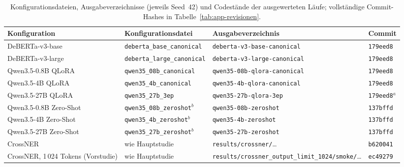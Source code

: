 \begin{table}[ht]
  \centering
  \footnotesize
  \caption[Konfigurationsdateien, Ausgabeverzeichnisse und Codestände der Läufe]{Konfigurationsdateien, Ausgabeverzeichnisse (jeweils Seed~42)
  und Codestände der ausgewerteten Läufe; vollständige Commit-Hashes in
  Tabelle~\ref{tab:app-revisionen}.}
  \label{tab:app-laeufe}
  \setlength{\tabcolsep}{3pt}
  \begin{tabularx}{\linewidth}{@{}>{\raggedright\arraybackslash}p{3.3cm}%
      >{\raggedright\arraybackslash}p{4.35cm}>{\raggedright\arraybackslash}X%
      l@{}}
    \toprule
    \textbf{Konfiguration} & \textbf{Konfigurationsdatei} &
    \textbf{Ausgabeverzeichnis} & \textbf{Commit} \\
    \midrule
    DeBERTa-v3-base       & \texttt{deberta\_base\_canonical}  & \texttt{deberta-v3-base-canonical}  & \texttt{179eed8} \\
    \addlinespace
    DeBERTa-v3-large      & \texttt{deberta\_large\_canonical} & \texttt{deberta-v3-large-canonical} & \texttt{179eed8} \\
    \addlinespace
    Qwen3.5-0.8B QLoRA    & \texttt{qwen35\_08b\_canonical}    & \texttt{qwen35-08b-qlora-canonical} & \texttt{179eed8} \\
    \addlinespace
    Qwen3.5-4B QLoRA      & \texttt{qwen35\_4b\_canonical}     & \texttt{qwen35-4b-qlora-canonical}  & \texttt{179eed8} \\
    \addlinespace
    Qwen3.5-27B QLoRA     & \texttt{qwen35\_27b\_3ep}          & \texttt{qwen35-27b-qlora-3ep}       & \texttt{179eed8}$^{a}$ \\
    \addlinespace
    Qwen3.5-0.8B Zero-Shot & \texttt{qwen35\_08b\_zeroshot}$^{b}$ & \texttt{qwen35-08b-zeroshot}     & \texttt{137bffd} \\
    \addlinespace
    Qwen3.5-4B Zero-Shot  & \texttt{qwen35\_4b\_zeroshot}$^{b}$  & \texttt{qwen35-4b-zeroshot}      & \texttt{137bffd} \\
    \addlinespace
    Qwen3.5-27B Zero-Shot & \texttt{qwen35\_27b\_zeroshot}$^{b}$ & \texttt{qwen35-27b-zeroshot}     & \texttt{137bffd} \\
    \addlinespace
    CrossNER           & wie Hauptstudie                    & \texttt{results/crossner/}\dots      & \texttt{b620041} \\
    \addlinespace
    CrossNER, 1\,024 Tokens (Vorstudie) & wie Hauptstudie & \texttt{results/\allowbreak crossner\_output\_limit\_1024/\allowbreak smoke/}\dots & \texttt{ec49279} \\

\end{tabularx}
\end{table}
